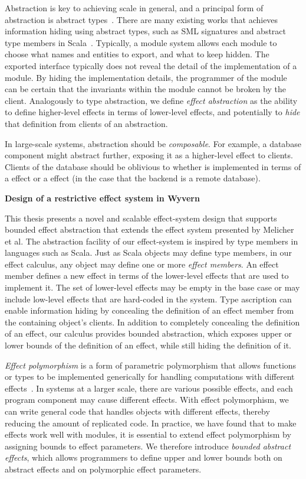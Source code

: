 Abstraction is key to achieving scale in general, and a principal form of abstraction is abstract types~\cite{10.1145/44501.45065}. 
There are many existing works that achieves information hiding using abstract types, such as SML signatures and abstract type members in Scala~\cite{odersky05}. 
Typically, a module system allows each module to choose what names and entities to export, and what to keep hidden. The exported interface typically does not reveal the detail of the implementation of a module. By hiding the implementation details, the programmer of the module can be certain that the invariants within the module cannot be broken by the client. Analogously to type abstraction, we define \textit{effect abstraction} as the ability to define higher-level effects in terms of lower-level effects, and potentially to \textit{hide} that definition from clients of an abstraction.  

In large-scale systems, abstraction should be \textit{composable}.  For example, a database component might abstract  further, exposing it as a higher-level  effect to clients.  Clients of the database should be oblivious to whether  is implemented in terms of a  effect or a  effect (in the case that the backend is a remote database).

\noindent\textbf{Design of a restrictive effect system in Wyvern}

This thesis presents a novel and scalable effect-system design that supports bounded effect abstraction that extends the effect system presented by Melicher et al.  The abstraction facility of our effect-system is inspired by type members in languages such as Scala. Just as Scala objects may define type members, in our effect calculus, any object may define one or more \textit{effect members}.  An effect member defines a new effect in terms of the lower-level effects that are used to implement it.  The set of lower-level effects may be empty in the base case or may include low-level effects that are hard-coded in the system.  Type ascription can enable information hiding by concealing the definition of an effect member from the containing object's clients. In addition to completely concealing the definition of an effect, our calculus provides bounded abstraction, which exposes upper or lower bounds of the definition of an effect, while still hiding the definition of it. 


\textit{Effect polymorphism} is a form of parametric polymorphism that allows functions or types to be implemented generically for handling computations with different effects~\cite{lucassen88}. In systems at a larger scale, there are various possible effects, and each program component may cause different effects. With effect polymorphism, we can write general code that handles objects with different effects, thereby reducing the amount of replicated code. In practice, we have found that to make effects work well with modules, it is essential to extend effect polymorphism by assigning bounds to effect parameters. We therefore introduce \textit{bounded abstract effects}, which allows programmers to define upper and lower bounds both on abstract effects and on polymorphic effect parameters.

